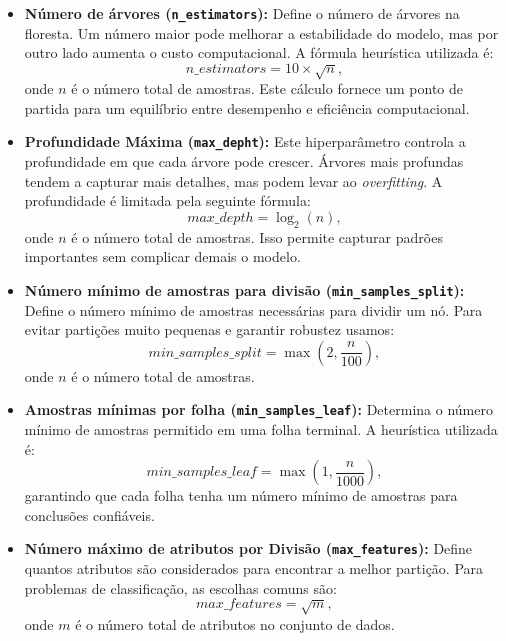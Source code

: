 \documentclass[a4paper,12pt]{article}
\begin{document}
\begin{itemize}
    \item \textbf{Número de árvores (\texttt{n\_estimators}):} Define o número de árvores na floresta. Um número maior pode melhorar a estabilidade do modelo, mas por outro lado aumenta o custo computacional. A fórmula heurística utilizada é:
    \begin{equation}
    n\_estimators = 10 \times \sqrt{n},
    \end{equation}
    onde \( n \) é o número total de amostras. Este cálculo fornece um ponto de partida para um equilíbrio entre desempenho e eficiência computacional.

    \item \textbf{Profundidade Máxima (\texttt{max\_depht}):} Este hiperparâmetro controla a profundidade em que cada árvore pode crescer. Árvores mais profundas tendem a capturar mais detalhes, mas podem levar ao \textit{overfitting}. A profundidade é limitada pela seguinte fórmula:
    \begin{equation}
    max\_depth = \log_2(n),
    \end{equation}
    onde \( n \) é o número total de amostras. Isso permite capturar padrões importantes sem complicar demais o modelo.

    \item \textbf{Número mínimo de amostras para divisão (\texttt{min\_samples\_split}):} Define o número mínimo de amostras necessárias para dividir um nó. Para evitar partições muito pequenas e garantir robustez usamos:
    \begin{equation}
    min\_samples\_split = \max(2, \frac{n}{100}),
    \end{equation}
    onde \( n \) é o número total de amostras.

    \item \textbf{Amostras mínimas por folha (\texttt{min\_samples\_leaf}):} Determina o número mínimo de amostras permitido em uma folha terminal. A heurística utilizada é:
    \begin{equation}
    min\_samples\_leaf = \max(1, \frac{n}{1000}),
    \end{equation}
    garantindo que cada folha tenha um número mínimo de amostras para conclusões confiáveis.

    \item \textbf{Número máximo de atributos por Divisão (\texttt{max\_features}):} Define quantos atributos são considerados para encontrar a melhor partição. Para problemas de classificação, as escolhas comuns são:
    \begin{equation}
    max\_features = \sqrt{m},
    \end{equation}
    onde \( m \) é o número total de atributos no conjunto de dados.
\end{itemize}
\end{document}
